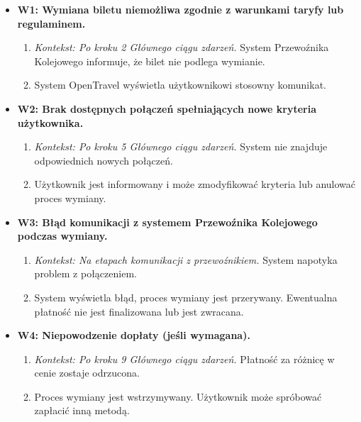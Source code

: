 \documentclass[a4paper,12pt]{article}
\begin{document}
\begin{itemize}
\begin{itemize}
\item \textbf{W1: Wymiana biletu niemożliwa zgodnie z warunkami taryfy lub regulaminem.}
\begin{enumerate}
\item \textit{Kontekst: Po kroku 2 Głównego ciągu zdarzeń.} System Przewoźnika Kolejowego informuje, że bilet nie podlega wymianie.
\item System OpenTravel wyświetla użytkownikowi stosowny komunikat.
\end{enumerate}
\item \textbf{W2: Brak dostępnych połączeń spełniających nowe kryteria użytkownika.}
\begin{enumerate}
\item \textit{Kontekst: Po kroku 5 Głównego ciągu zdarzeń.} System nie znajduje odpowiednich nowych połączeń.
\item Użytkownik jest informowany i może zmodyfikować kryteria lub anulować proces wymiany.
\end{enumerate}
\item \textbf{W3: Błąd komunikacji z systemem Przewoźnika Kolejowego podczas wymiany.}
\begin{enumerate}
\item \textit{Kontekst: Na etapach komunikacji z przewoźnikiem.} System napotyka problem z połączeniem.
\item System wyświetla błąd, proces wymiany jest przerywany. Ewentualna płatność nie jest finalizowana lub jest zwracana.
\end{enumerate}
\item \textbf{W4: Niepowodzenie dopłaty (jeśli wymagana).}
\begin{enumerate}
\item \textit{Kontekst: Po kroku 9 Głównego ciągu zdarzeń.} Płatność za różnicę w cenie zostaje odrzucona.
\item Proces wymiany jest wstrzymywany. Użytkownik może spróbować zapłacić inną metodą.
\end{enumerate}
\end{itemize}
\end{itemize}
\end{document}
